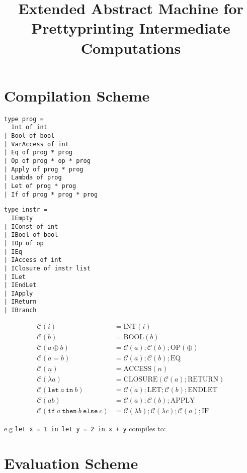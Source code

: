 \documentclass[11pt]{article}
\begin{document}
\title{Extended Abstract Machine for Prettyprinting Intermediate Computations}
\maketitle

\section{Compilation Scheme}

\begin{verbatim}
type prog =
  Int of int
| Bool of bool
| VarAccess of int
| Eq of prog * prog
| Op of prog * op * prog
| Apply of prog * prog
| Lambda of prog
| Let of prog * prog
| If of prog * prog * prog\end{verbatim}

\begin{verbatim}
type instr =
  IEmpty
| IConst of int
| IBool of bool
| IOp of op
| IEq
| IAccess of int
| IClosure of instr list
| ILet
| IEndLet
| IApply
| IReturn
| IBranch\end{verbatim}


\begin{align*}
\mathcal{C}(i) &= \text{INT}(i)\\
\mathcal{C}(b) &= \text{BOOL}(b)\\
\mathcal{C}(a \oplus b) &= \mathcal{C}(a); \mathcal{C}(b); \text{OP}(\oplus)\\
\mathcal{C}(a = b) &= \mathcal{C}(a); \mathcal{C}(b); \text{EQ}\\
\mathcal{C}(\underline{n}) &= \text{ACCESS}(n)\\
\mathcal{C}(\lambda a) &= \text{CLOSURE}(\mathcal{C}(a); \text{RETURN})\\
\mathcal{C}(\texttt{let}\ a\ \texttt{in}\ b) &= \mathcal{C}(a); \text{LET}; \mathcal{C}(b); \text{ENDLET}\\
\mathcal{C}(a b) &= \mathcal{C}(a); \mathcal{C}(b); \text{APPLY}\\
\mathcal{C}(\texttt{if}\ a\ \texttt{then}\ b\ \texttt{else}\ c) &= \mathcal{C}(\lambda b); \mathcal{C}(\lambda c); \mathcal{C}(a); \text{IF}
\end{align*}

e.g \texttt{let x = 1 in let y = 2 in x + y} compiles to:



\section{Evaluation Scheme}
\end{document}
